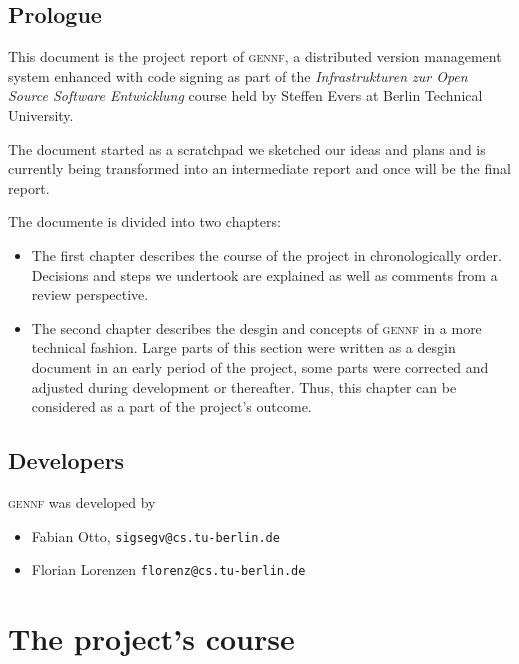 \documentclass[fleqn, 10pt, a4paper]{report} \usepackage{amssymb}
\newcommand{\GENNF}{\textsc{gennf}}
\begin{document}

\tableofcontents
\newpage

\section*{Prologue}

This document is the project report of \GENNF{}, a distributed version
management system enhanced with code signing as part of the
\emph{Infrastrukturen zur Open Source Software Entwicklung} course
held by Steffen Evers at Berlin Technical University.

The document started as a scratchpad we sketched our ideas and plans
and is currently being transformed into an intermediate report and
once will be the final report.

The documente is divided into two chapters:
\begin{itemize}
\item The first chapter describes the course of the project in
  chronologically order. Decisions and steps we undertook are
  explained as well as comments from a review perspective.
\item The second chapter describes the desgin and concepts of \GENNF{}
  in a more technical fashion. Large parts of this section were
  written as a desgin document in an early period of the project, some
  parts were corrected and adjusted during development or thereafter.
  Thus, this chapter can be considered as a part of the project's
  outcome.
\end{itemize}

\section*{Developers}

\GENNF{} was developed by
\begin{itemize}
\item Fabian Otto, \texttt{sigsegv@cs.tu-berlin.de}
\item Florian Lorenzen \texttt{florenz@cs.tu-berlin.de}
\end{itemize}


\chapter{The project's course \label{course}}
\end{document}
